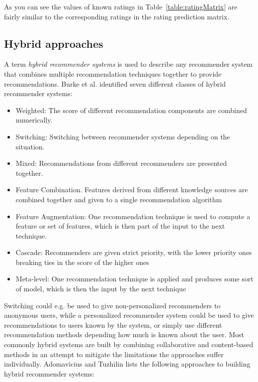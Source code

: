 As you can see the values of known ratings in Table~\ref{table:ratingMatrix}
are fairly similar to the corresponding ratings in the rating prediction
matrix.

\subsection{Hybrid approaches}

A term \emph{hybrid recommender systems} is used to describe any recommender
system that combines multiple recommendation techniques together to provide
recommendations. Burke et al. \cite{Burke2002} identified seven different
classes of hybrid recommender systems:

\begin{itemize}
\item Weighted: The score of different recommendation components are combined numerically.
\item Switching: Switching between recommender systems depending on the situation.
\item Mixed: Recommendations from different recommenders are presented together.
\item Feature Combination. Features derived from different knowledge sources
are combined together and given to a single recommendation algorithm
\item Feature Augmentation: One recommendation technique is used to compute a
feature or set of features, which is then part of the input to the next
technique.
\item Cascade: Recommenders are given strict priority, with the lower priority
ones breaking ties in the score of the higher ones
\item Meta-level: One recommendation technique is applied and produces some
sort of model, which is then the input by the next technique
\end{itemize}

Switching could e.g. be used to give non-personalized recommenders to anonymous users,
while a personalized recommender system could be used to give recommendations to users
known by the system, or simply use different recommendation methods depending how much
is known about the user. Most commonly hybrid systems are built by combining collaborative and
content-based methods in an attempt to mitigate the limitations the approaches
suffer individually. Adomavicius and Tuzhilin \cite{Adomavicius2005} lists the
following approaches to building hybrid recommender systems:

